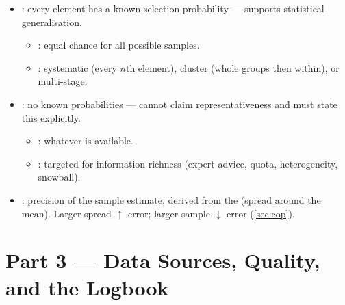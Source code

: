\documentclass[../main.tex]{subfiles}
\begin{document}
\begin{itemize}
  \item {}: every element has a known selection probability — supports statistical generalisation.
    \begin{itemize}
      \item {}: equal chance for all possible samples.
      \item {}: systematic (every $n$th element), cluster (whole groups then within), or multi-stage.
    \end{itemize}
  \item {}: no known probabilities — cannot claim representativeness and must state this explicitly.
    \begin{itemize}
      \item {}: whatever is available.
      \item {}: targeted for information richness (expert advice, quota, heterogeneity, snowball).
    \end{itemize}
  \item {}: precision of the sample estimate, derived from the  (spread around the mean). Larger spread $\uparrow$ error; larger sample $\downarrow$ error (\autoref{sec:eop}).
\end{itemize}

\section{Part 3 — Data Sources, Quality, and the Logbook}
\label{sec:data-sources}
\end{document}
